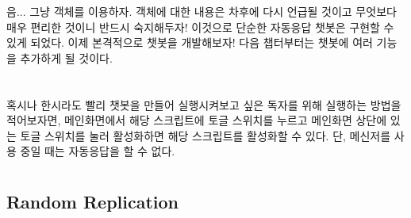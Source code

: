 \documentclass[10pt,b6paper,final]{book}
\begin{document}
음... 그냥 객체를 이용하자.
객체에 대한 내용은 차후에 다시 언급될 것이고 무엇보다 매우 편리한 것이니 반드시 숙지해두자!
이것으로 단순한 자동응답 챗봇은 구현할 수 있게 되었다.
이제 본격적으로 챗봇을 개발해보자! 다음 챕터부터는 챗봇에 여러 기능을 추가하게 될 것이다.
\\
\\
\\
혹시나 한시라도 빨리 챗봇을 만들어 실행시켜보고 싶은 독자를 위해 실행하는 방법을 적어보자면,
메인화면에서 해당 스크립트에 토글 스위치를 누르고 메인화면 상단에 있는 토글 스위치를 눌러
활성화하면 해당 스크립트를 활성화할 수 있다. 단, 메신저를 사용 중일 때는 자동응답을 할 수 없다.

\chapter{}

\section{Random Replication}
\end{document}
